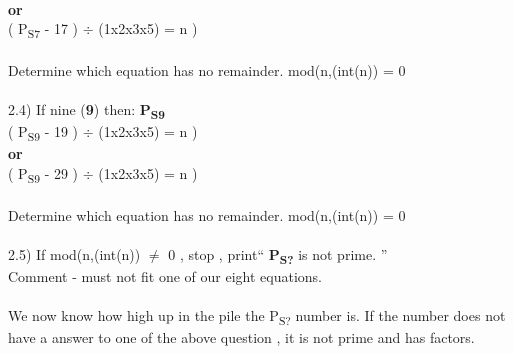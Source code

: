 \documentclass[12pt,letterpaper,oneside,titlepage]{article}
\begin{document}
\\
 \textbf{or} \\
 \hspace*{12mm} ( P\textsubscript{S7} - 17 ) $\div$ (1x2x3x5) = n )
\\
\\
\hspace*{12mm} Determine which equation has no remainder. mod(n,(int(n)) = 0 
\\
\\
2.4) If nine (\textbf{9}) then:  \textbf{P\textsubscript{S9}}
\\
\hspace*{12mm} ( P\textsubscript{S9} - 19 ) $\div$ (1x2x3x5) = n ) 
\\
\textbf{or} 
\\
\hspace*{12mm}( P\textsubscript{S9} - 29 ) $\div$ (1x2x3x5) = n )
\\
\\
\hspace*{12mm} Determine which equation has no remainder. mod(n,(int(n)) = 0 
\\
\\
2.5) If mod(n,(int(n)) $\ne$ 0 , stop , print`` \textbf{P\textsubscript{S?}} is not prime. ''  
\\
\hspace*{12mm}  Comment - must not fit one of our eight equations.
\\
\\
We now know how high up in the pile the P\textsubscript{S?} number is. If the number does not have a answer to one of the above question , it is not prime and has factors.
\\
\end{document}
